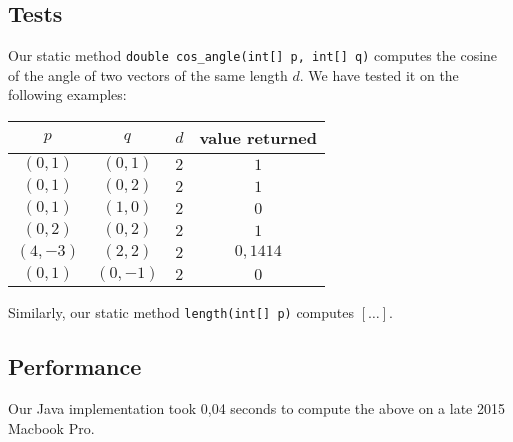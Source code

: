\documentclass{tufte-handout}
\begin{document}
  \subsection{Tests}

  Our static method {\tt double cos\_angle(int[] p, int[] q)} computes the cosine of the angle of two vectors of the same length $d$.
  We have tested it on the following examples:

  \bigskip\noindent
{ \small\sf
  \begin{tabular}{cccc}
  \toprule
  $p$     & $q$     & $d$ & value returned \\\midrule
  $(0,1)$ & $(0,1)$ & $2$ & $1$ \\
  $(0,1)$ & $(0,2)$ & $2$ & $1$\\
  $(0,1)$ & $(1,0)$ & $2$ & $0$\\
  $(0,2)$ & $(0,2)$ & $2$ & $1$\\
  $(4,-3)$ & $(2,2)$ & $2$ & $0,1414$\\
  $(0,1)$ & $(0,-1)$ & $2$ & $0$\\
  \bottomrule
  \end{tabular}
}

\bigskip
  Similarly, our static method {\tt length(int[] p)} computes $[\ldots]$.
  \subsection{Performance}
  Our Java implementation took 0,04 seconds to compute the above on a late 2015 Macbook Pro.
\end{document}
